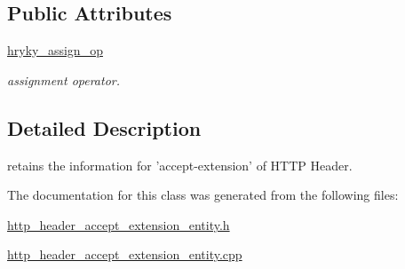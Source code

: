 \subsection*{Public Attributes}
\begin{DoxyCompactItemize}
\item 
\hypertarget{classhryky_1_1http_1_1header_1_1accept_1_1extension_1_1_entity_aa80dbac5b6d091c19e106c4dd190671e}{\hyperlink{classhryky_1_1http_1_1header_1_1accept_1_1extension_1_1_entity_aa80dbac5b6d091c19e106c4dd190671e}{hryky\-\_\-assign\-\_\-op}}\label{classhryky_1_1http_1_1header_1_1accept_1_1extension_1_1_entity_aa80dbac5b6d091c19e106c4dd190671e}

\begin{DoxyCompactList}\small\item\em assignment operator. \end{DoxyCompactList}\end{DoxyCompactItemize}


\subsection{Detailed Description}
retains the information for 'accept-\/extension' of H\-T\-T\-P Header. 

The documentation for this class was generated from the following files\-:\begin{DoxyCompactItemize}
\item 
\hyperlink{http__header__accept__extension__entity_8h}{http\-\_\-header\-\_\-accept\-\_\-extension\-\_\-entity.\-h}\item 
\hyperlink{http__header__accept__extension__entity_8cpp}{http\-\_\-header\-\_\-accept\-\_\-extension\-\_\-entity.\-cpp}\end{DoxyCompactItemize}
